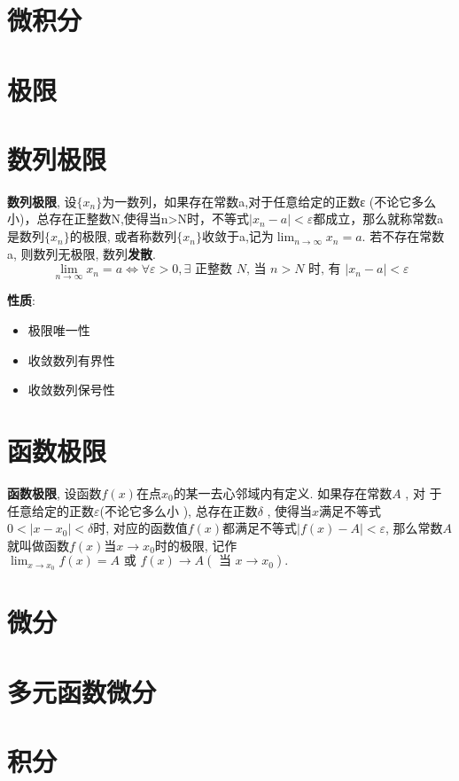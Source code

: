 \documentclass{article}
\title{}\date{} \setlength{\parindent}{0pt} \linespread{1.25}
\newcommand{\env}[2]{\begin{#1}#2\end{#1}}
\newcommand{\defi}[2]{\textbf{#1}, #2}
\begin{document}
\tableofcontents

\section{微积分}
	\section{极限}
		\section{数列极限}
			\defi{数列极限}{
				设$\{x_n\}$为一数列，如果存在常数a,对于任意给定的正数ε (不论它多么小)，总存在正整数N,使得当n>N时，不等式$\left|x_{n}-a\right|<\varepsilon$都成立，那么就称常数a是数列$\{x_n\}$的极限, 或者称数列$\{x_n\}$收敛于a,记为$\lim _{n \rightarrow \infty} x_{n}=a$. 若不存在常数a, 则数列无极限, 数列\textbf{发散}.
				$$\lim _{n \rightarrow \infty} x_{n}=a \Leftrightarrow \forall \varepsilon>0, \exists \text { 正整数 } N \text {, 当 } n>N \text { 时, 有 }\left|x_{n}-a\right|<\varepsilon$$
			}

				\textbf{性质}: 
					\env{itemize}{
					\item 极限唯一性
					\item 收敛数列有界性
					\item 收敛数列保号性
					}

		\section{函数极限}
			\defi{函数极限}{
				设函数$f(x)$在点$x_{0}$的某一去心邻域内有定义. 如果存在常数$A$ , 对 于任意给定的正数$\varepsilon$(不论它多么小 ), 总存在正数$\delta$ , 使得当$x$满足不等式$0<\left|x-x_{0}\right|<\delta$时, 对应的函数值$f(x)$都满足不等式$|f(x)-A|<\varepsilon$, 那么常数$A$就叫做函数$f(x)$当$x \rightarrow x_{0}$时的极限, 记作$\lim _{x \rightarrow x_{0}} f(x)=A \text { 或 } f(x) \rightarrow A\left(\text { 当 } x \rightarrow x_{0}\right) .$
			}

    \section{微分}

    	\section{多元函数微分}

    \section{积分}
\end{document}

